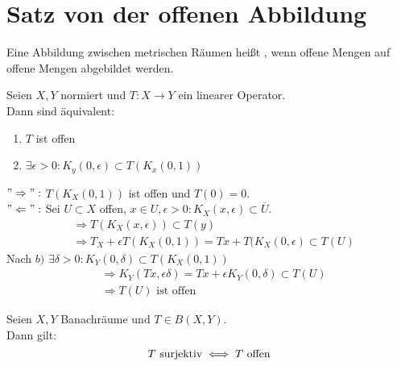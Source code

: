 
\section{Satz von der offenen Abbildung}



\begin{definition} \label{def:10.1-offAbbildung}
	Eine Abbildung zwischen metrischen Räumen heißt , wenn offene Mengen auf offene Mengen abgebildet werden.
\end{definition}


\begin{lemma} \label{lemma:10.2}
	Seien $X, Y$ normiert und $T: X \rightarrow Y$ ein linearer Operator. \\
	Dann sind äquivalent:
	\begin{enumerate}[label=\alph*\upshape)]
		\item $T$ ist offen
		\item $\exists \epsilon > 0: K_{y}(0, \epsilon) \subset T(K_{x}(0, 1))$
	\end{enumerate}
\end{lemma}

\begin{beweis}
	$"\Rightarrow":$ $T(K_{X}(0, 1))$ ist offen und $T(0) = 0$. \\
	$"\Leftarrow":$ Sei $U \subset X$ offen, $x \in U, \epsilon > 0: K_{X}(x, \epsilon) \subset \overline{U}$.
	\begin{align*}
		& \Rightarrow T( K_{X}(x, \epsilon)) \subset T(y) \\
		& \Rightarrow T_{X} + \epsilon T(K_{X}(0, 1)) = Tx + T(K_{X}(0, \epsilon) \subset T(U)
	\end{align*}
	Nach $b)$ $\exists \delta > 0: K_{Y}(0, \delta) \subset T(K_{X}(0, 1))$
	\begin{align*}
		& \Rightarrow K_{Y}(Tx, \epsilon \delta) = T x + \epsilon K_{Y}(0, \delta) \subset T(U) \\
		& \Rightarrow T(U) \text{ ist offen}
	\end{align*}	
\end{beweis}


\begin{satz}   \label{satz:10.3-offeneAbbildung}
	Seien $X, Y$ Banachräume und $T \in B(X, Y)$. \\
	Dann gilt:
	\[ T \text{ surjektiv} \iff T \text{ offen} \]
\end{satz}

